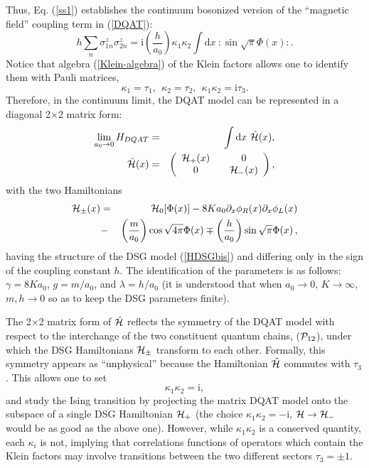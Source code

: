 Thus, Eq. (\ref{ss1}) establishes the continuum bosonized version
of the ``magnetic field'' coupling term in (\ref{DQAT}):
\begin{equation}
h \sum_n \sigma_{1n}^z \sigma_{2n}^z = \mbox{i} \left( \frac{h}{a_0} \right)
\kappa_1 \kappa_2 \int \mbox{d} x~ :\sin \sqrt{\pi} \Phi (x) :.
\label{hterm}
\end{equation}
Notice that algebra (\ref{Klein-algebra}) of the Klein factors allows one
to identify them with Pauli matrices,
$$
\kappa_1 = \tau_1, ~~\kappa_2 = \tau_2, ~~
\kappa_1 \kappa_2 = \mbox{i} \tau_3.
$$
Therefore, in the continuum limit, the DQAT model can be represented in a
diagonal 2$\times$2 matrix form:
\begin{eqnarray}
\lim_{a_0 \rightarrow 0} H_{DQAT} &=& \int \mbox{d} x~ \hat{\cal{H}} (x),
\nonumber\\
\hat{\cal{H}} (x) &=&
\left(
\begin{array}{clcr}
{\cal{H}}_+ (x)&& 0\\
0&& {\cal{H}}_- (x)
\end{array}
\right) ,
\label{matrixDGS}
\end{eqnarray}
with the two Hamiltonians
\begin{eqnarray}
{\cal{H}}_{\pm} (x) &=& {\cal{H}}_0[\Phi(x)]
-8 K a_0 \partial_x \phi_R(x)\partial_x\phi_L(x)\nonumber\\
&-& \left( \frac{m}{a_0} \right)\cos\sqrt{4\pi}\Phi(x) 
\mp \left( \frac{h}{a_0} \right) \sin\sqrt{\pi}\Phi(x)\, ,
\label{QAT-DSG}
\end{eqnarray}
having the structure of the DSG model (\ref{HDSGbis})
and differing only in the sign of the coupling constant $h$.
The identification of the parameters is as follows:
$\gamma=8 K a_0$, $g=m/a_0$, and $\lambda=
h/a_0$ (it is understood that when $a_0\to 0$, $K \to \infty$,
$m,h \to 0$ so as to keep the DSG parameters finite).

The 2$\times$2 matrix form of $\hat{\cal{H}}$ reflects the
symmetry of the DQAT model
with respect to the interchange
of the two constituent quantum chains, (${\cal{P}}_{12}$),
under which the DSG Hamiltonians ${\cal{H}}_{\pm}$ transform to each other.
Formally, this symmetry appears as ``unphysical'' because the Hamiltonian
$\hat{\cal{H}}$ commutes with $\tau_3$.
This allows one to set
\begin{equation}
\kappa_1 \kappa_2 = \mbox{i}, \label{proj-H+}
\end{equation}
and
study the Ising transition by
projecting the matrix DQAT model onto the subspace
of a single DSG Hamiltonian ${\cal{H}}_+$
(the choice $\kappa_1 \kappa_2 = -\mbox{i}$, ${\cal{H}} \rightarrow{\cal{H}}_-$
would be as good as the above one). However, while
$\kappa_1\kappa_2$ is a conserved quantity, each $\kappa_i$ is not,
implying that correlations functions of operators which contain
the Klein factors may involve transitions between the two different
sectors $\tau_3=\pm 1$.

